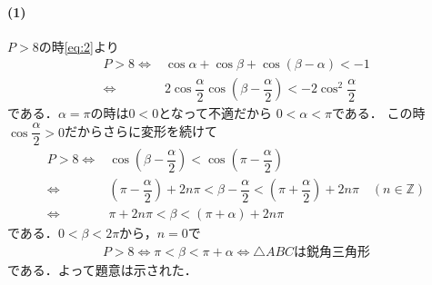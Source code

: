 \documentclass[../../main.tex]{subfiles}
\begin{document}
\paragraph{(1)}

$P>8$の時\cref{eq:2}より
\begin{align}
  P>8
  \iff &
  \cos\alpha+\cos\beta+\cos(\beta-\alpha)<-1\\
  \iff &
  2\cos\dfrac{\alpha}{2}\cos\left(\beta-\dfrac{\alpha}{2}\right)<-2\cos^2\dfrac{\alpha}{2}
\end{align}
である．$\alpha=\pi$の時は$0<0$となって不適だから $0<\alpha<\pi$である．
この時$\cos\dfrac{\alpha}{2}>0$だからさらに変形を続けて
\begin{align}
  P>8
  \iff
  & \cos\left(\beta-\dfrac{\alpha}{2}\right)<\cos\left(\pi-\dfrac{\alpha}{2}\right)\\
  \iff
  & \left(\pi-\dfrac{\alpha}{2}\right)+2n\pi<\beta-\dfrac{\alpha}{2}<\left(\pi+\dfrac{\alpha}{2}\right)+2n\pi\quad(n\in\mathbb Z)\\
  \iff
  &\pi+2n\pi<\beta<(\pi+\alpha)+2n\pi \label{eq:3}
\end{align}
である．$0<\beta<2\pi$から，$n=0$で
\begin{align}
  P > 8 \iff \pi<\beta<\pi+\alpha \iff \triangle ABC\text{は鋭角三角形}
\end{align}
である．よって題意は示された．
\end{document}
